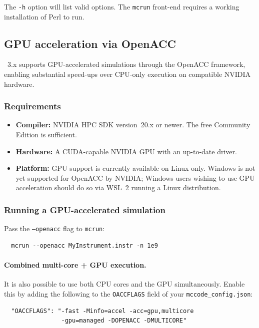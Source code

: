 The \verb+-h+ option will list valid options. The \verb+mcrun+ front-end
requires a working installation of Perl to run.

\subsection{GPU acceleration via OpenACC}
\label{s:gpu}

\McStas~3.x supports GPU-accelerated simulations through the OpenACC
framework, enabling substantial speed-ups over CPU-only execution on
compatible NVIDIA hardware.

\subsubsection{Requirements}

\begin{itemize}
  \item \textbf{Compiler:} NVIDIA HPC SDK version~20.x or newer.  The
        free Community Edition is sufficient.
  \item \textbf{Hardware:} A CUDA-capable NVIDIA GPU with an up-to-date
        driver.
  \item \textbf{Platform:} GPU support is currently available on Linux
        only.  Windows is not yet supported for OpenACC by NVIDIA; Windows
        users wishing to use GPU acceleration should do so via
        WSL~2 running a Linux distribution.
\end{itemize}

\subsubsection{Running a GPU-accelerated simulation}

Pass the \texttt{--openacc} flag to \texttt{mcrun}:
\begin{verbatim}
  mcrun --openacc MyInstrument.instr -n 1e9
\end{verbatim}

\paragraph{Combined multi-core + GPU execution.}
It is also possible to use both CPU cores and the GPU simultaneously.
Enable this by adding the following to the \texttt{OACCFLAGS} field of
your \texttt{mccode\_config.json}:
\begin{verbatim}
  "OACCFLAGS": "-fast -Minfo=accel -acc=gpu,multicore
                -gpu=managed -DOPENACC -DMULTICORE"
\end{verbatim}

